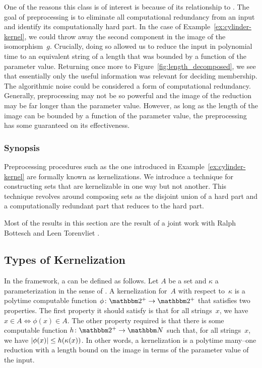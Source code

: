 One of the reasons this class is of interest is because of its relationship to .
The goal of preprocessing is to eliminate all computational redundancy from an input and identify its computationally hard part.
In the case of Example~\ref{ex:cylinder-kernel}, we could throw away the second component in the image of the isomorphism~$g$.
Crucially, doing so allowed us to reduce the input in polynomial time to an equivalent string of a length that was bounded by a function of the parameter value.
Returning once more to Figure~\ref{fig:length_decomposed}, we see that essentially only the useful information was relevant for deciding membership.
The algorithmic noise could be considered a form of computational redundancy.
Generally, preprocessing may not be so powerful and the image of the reduction may be far longer than the parameter value.
However, as long as the length of the image can be bounded by a function of the parameter value, the preprocessing has some guaranteed on its effectiveness.

\subsubsection{Synopsis}
Preprocessing procedures such as the one introduced in Example~\ref{ex:cylinder-kernel} are formally known as kernelizations.
We introduce a technique for constructing sets that are kernelizable in one way but not another.
This technique revolves around composing sets as the disjoint union of a hard part and a computationally redundant part that reduces to the hard part.

Most of the results in this section are the result of a joint work with Ralph Bottesch and Leen Torenvliet \parencite{witteveen2019hierarchy}.

\subsection{Types of Kernelization}
In the \citeauthor{flum2006parameterized} framework, a  can be defined as follows.
Let $A$ be a set and $\kappa$ a parameterization in the sense of \citeauthor{flum2006parameterized}.
A kernelization for~$A$ with respect to~$\kappa$ is a polytime computable function $\phi\colon \binary^+ \to \binary^+$ that satisfies two properties.
The first property it should satisfy is that for all strings~$x$, we have $x \in A \iff \phi(x) \in A$.
The other property required is that there is some computable function $h\colon \binary^+ \to \bbN$ such that, for all strings~$x$, we have ${\lvert\phi(x)\rvert} \le h(\kappa(x))$.
In other words, a kernelization is a polytime many--one reduction with a length bound on the image in terms of the parameter value of the input.

